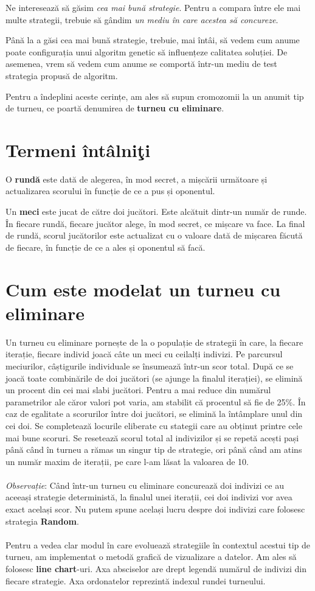 Ne interesează să găsim \textit{cea mai bună strategie}. Pentru a compara între ele mai multe strategii, trebuie să gândim \textit{un mediu în care acestea să concureze}. 
 
Până la a găsi cea mai bună strategie, trebuie, mai întâi, să vedem cum anume poate configurația unui algoritm genetic să influențeze calitatea soluției. De asemenea, vrem să vedem cum anume se comportă într-un mediu de test strategia propusă de algoritm. 
 
Pentru a îndeplini aceste cerințe, am ales să supun cromozomii la un anumit tip de turneu, ce poartă denumirea de \textbf{turneu cu eliminare}.  

\section {Termeni întâlniţi}
O \textbf{rundă} este dată de alegerea, în mod secret, a mișcării următoare și actualizarea scorului în funcție de ce a pus și oponentul. 

Un \textbf{meci} este jucat de către doi jucători. Este alcătuit dintr-un număr de runde. În fiecare rundă, fiecare jucător alege, în mod secret, ce mișcare va face. La final de rundă, scorul jucătorilor este actualizat cu o valoare dată de mișcarea făcută de fiecare, în funcție de ce a ales și oponentul să facă. 

\section {Cum este modelat un turneu cu eliminare}
 
Un turneu cu eliminare pornește de la o populație de strategii în care, la fiecare iterație, fiecare individ joacă câte un meci cu ceilalți indivizi. Pe parcursul meciurilor, câștigurile individuale se însumează într-un scor total. După ce se joacă toate combinările de doi jucători (se ajunge la finalul iterației), se elimină un procent din cei mai slabi jucători.  Pentru a mai reduce din numărul parametrilor ale căror valori pot varia, am stabilit că procentul să fie de 25\%. În caz de egalitate a scorurilor între doi jucători, se elimină la întâmplare unul din cei doi. Se completează locurile eliberate cu stategii care au obținut printre cele mai bune scoruri. Se resetează scorul total al indivizilor și se repetă acești pași până când în turneu a rămas un singur tip de strategie, ori până când am atins un număr maxim de iterații, pe care l-am lăsat la valoarea de 10.  
\\\\
\textit{Observație}: Când într-un turneu cu eliminare concurează doi indivizi ce au aceeași strategie deterministă, la finalul unei iterații, cei doi indivizi vor avea exact același scor. Nu putem spune același lucru despre doi indivizi care folosesc strategia \textbf{Random}.
\\\\
Pentru a vedea clar modul în care evoluează strategiile în contextul acestui tip de turneu, am implementat o metodă grafică de vizualizare a datelor. Am ales să folosesc \textbf{line chart}-uri. Axa absciselor are drept legendă numărul de indivizi din fiecare strategie. Axa ordonatelor reprezintă indexul rundei turneului.

